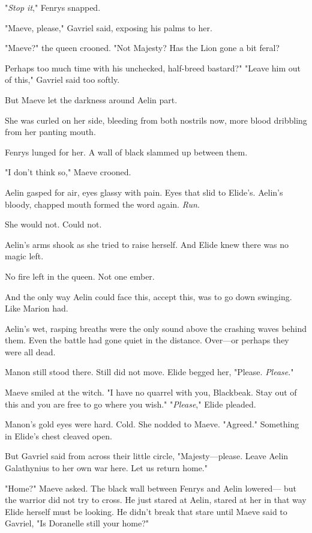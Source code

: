 "\emph{Stop it}," Fenrys snapped.

"Maeve, please," Gavriel said, exposing his palms to her.

"Maeve?"
the queen crooned.
"Not Majesty?
Has the Lion gone a bit feral?

Perhaps too much time with his unchecked, half-breed bastard?"
"Leave him out of this," Gavriel said too softly.

But Maeve let the darkness around Aelin part.

She was curled on her side, bleeding from both nostrils now, more blood dribbling from her panting mouth.

Fenrys lunged for her.
A wall of black slammed up between them.

"I don't think so," Maeve crooned.

Aelin gasped for air, eyes glassy with pain.
Eyes that slid to Elide's.
Aelin's bloody, chapped mouth formed the word again.
\emph{Run}.

She would not.
Could not.

Aelin's arms shook as she tried to raise herself.
And Elide knew there was no magic left.

No fire left in the queen.
Not one ember.

And the only way Aelin could face this, accept this, was to go down swinging.
Like Marion had.

Aelin's wet, rasping breaths were the only sound above the crashing waves behind them.
Even the battle had gone quiet in the distance.
Over---or perhaps they were all dead.

Manon still stood there.
Still did not move.
Elide begged her, "Please.
\emph{Please}."

Maeve smiled at the witch.
"I have no quarrel with you, Blackbeak.
Stay out of this and you are free to go where you wish."
"\emph{Please}," Elide pleaded.

Manon's gold eyes were hard.
Cold.
She nodded to Maeve.
"Agreed."
Something in Elide's chest cleaved open.

But Gavriel said from across their little circle, "Majesty---please.
Leave Aelin Galathynius to her own war here.
Let us return home."

"Home?"
Maeve asked.
The black wall between Fenrys and Aelin lowered--- but the warrior did not try to cross.
He just stared at Aelin, stared at her in that way Elide herself must be looking.
He didn't break that stare until Maeve said to Gavriel, "Is Doranelle still your home?"


